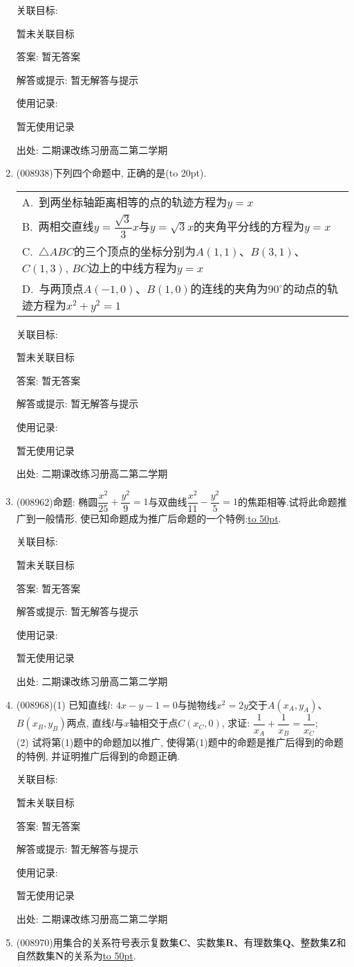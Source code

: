 \documentclass[10pt,a4paper]{article}
\newcommand{\blank}[1]{\underline{\hbox to #1pt{}}}
\newcommand{\bracket}[1]{(\hbox to #1pt{})}
\newcommand{\onech}[4]{\par\begin{tabular}{p{.9\textwidth}}
A.~#1\\
B.~#2\\
C.~#3\\
D.~#4
\end{tabular}}
\begin{document}
\begin{enumerate}[1.]
关联目标:

暂未关联目标

答案: 暂无答案

解答或提示: 暂无解答与提示

使用记录:

暂无使用记录


出处: 二期课改练习册高二第二学期
\item { (008938)}下列四个命题中, 正确的是\bracket{20}.
\onech{到两坐标轴距离相等的点的轨迹方程为$y=x$}{两相交直线$y=\dfrac{\sqrt 3}3x$与$y=\sqrt 3x$的夹角平分线的方程为$y=x$}{$\triangle ABC$的三个顶点的坐标分别为$A(1,1)$、$B(3,1)$、$C(1,3)$, $BC$边上的中线方程为$y=x$}{与两顶点$A(-1,0)$、$B(1,0)$的连线的夹角为$90^{\circ }$的动点的轨迹方程为$x^2+y^2=1$}


关联目标:

暂未关联目标

答案: 暂无答案

解答或提示: 暂无解答与提示

使用记录:

暂无使用记录


出处: 二期课改练习册高二第二学期
\item { (008962)}命题: 椭圆$\dfrac{x^2}{25}+\dfrac{y^2}9=1$与双曲线$\dfrac{x^2}{11}-\dfrac{y^2}5=1$的焦距相等.试将此命题推广到一般情形, 使已知命题成为推广后命题的一个特例:\blank{50}.


关联目标:

暂未关联目标

答案: 暂无答案

解答或提示: 暂无解答与提示

使用记录:

暂无使用记录


出处: 二期课改练习册高二第二学期
\item { (008968)}(1) 已知直线$l$: $4x-y-1=0$与抛物线$x^2=2y$交于$A(x_A,y_A)$、$B(x_B,y_B)$两点, 直线$l$与$x$轴相交于点$C(x_C,0)$, 求证: $\dfrac 1{x_A}+\dfrac 1{x_B}=\dfrac 1{x_C}$;\\
(2) 试将第(1)题中的命题加以推广, 使得第(1)题中的命题是推广后得到的命题的特例, 并证明推广后得到的命题正确.


关联目标:

暂未关联目标

答案: 暂无答案

解答或提示: 暂无解答与提示

使用记录:

暂无使用记录


出处: 二期课改练习册高二第二学期
\item { (008970)}用集合的关系符号表示复数集$\mathbf{C}$、实数集$\mathbf{R}$、有理数集$\mathbf{Q}$、整数集$\mathbf{Z}$和自然数集$\mathbf{N}$的关系为\blank{50}.



\end{enumerate}
\end{document}
